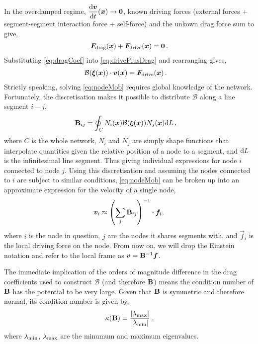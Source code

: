 In the overdamped regime, $\dfrac{\rvar{d}\vec{v}}{\rvar{d}t}(\vec{x}) \to \vec{0}$, known driving forces (external forces + segment-segment interaction force + self-force) and the unkown drag force sum to give,
\begin{align}\label{eq:drivePlusDrag}
  \vec{F}_\rvar{drag}(\vec{x}) + \vec{F}_\rvar{drive}(\vec{x}) = \vec{0}\,.
\end{align}
Substituting \cref{eq:dragCoef} into \cref{eq:drivePlusDrag} and rearranging gives,
\begin{align}\label{eq:nodeMob}
  \mathcal{B}(\vec{\xi}(\vec{x})) \cdot \vec{v}(\vec{x}) & = \vec{F}_\rvar{drive}(\vec{x})\,.
\end{align}
Strictly speaking, solving \cref{eq:nodeMob} requires global knowledge of the network. Fortunately, the discretisation makes it possible to distribute $\mathcal{B}$ along a line segment $i-j$,
\begin{align}\label{eq:dragMatrix}
  \mtx{B}_{ij} & = \oint_{C} N_i(\vec{x}) \mathcal{B}(\vec{\xi}(\vec{x})) N_j(\vec{x}) \rvar{d}L\,,
\end{align}
where $C$ is the whole network, $N_i$ and $N_j$ are simply shape functions that interpolate quantities given the relative position of a node to a segment, and $\textrm{d}L$ is the infinitesimal line segment. Thus giving individual expressions for node $i$ connected to node $j$. Using this discretisation and assuming the nodes connected to $i$ are subject to similar conditions, \cref{eq:nodeMob} can be broken up into an approximate expression for the velocity of a single node,
\begin{align}\label{eq:nodeVel}
  \vec{v}_i \approx \left(\sum\limits_j \mtx{B}_{ij}\right)^{-1} \cdot \vec{f}_i,\,
\end{align}
where $i$ is the node in question, $j$ are the nodes it shares segments with, and $\vec{f}_i$ is the local driving force on the node. From now on, we will drop the Einstein notation and refer to the local frame as $\vec{v} = \mtx{B}^{-1} \vec{f}$.

The immediate implication of the orders of magnitude difference in the drag coefficients used to construct $\mathcal{B}$ (and therefore $\mathbf{B}$) means the condition number of $\mathbf{B}$ has the potential to be very large. Given that $\mathbf{B}$ is symmetric and therefore normal, its condition number is given by,
\begin{align}\label{eq:conditionNumb}
  \kappa(\mathbf{B}) = \dfrac{\lvert \lambda_{\textrm{max}} \rvert}{\lvert \lambda_{\textrm{min}} \rvert} \,,
\end{align}
where $\lambda_{\textrm{min}}$, $\lambda_{\textrm{max}}$ are the minumum and maximum eigenvalues.

